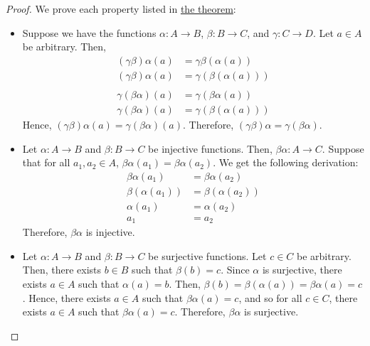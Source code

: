     \begin{proof} We prove each property listed in \hyperref[thm:fcprop]{the theorem}:
        \begin{itemize}
            \item Suppose we have the functions \(\alpha : A \to B\), \(\beta : B \to C\), and \(\gamma : C \to D\). Let \(a\in A\) be arbitrary. Then,
            \begin{align*}
                (\gamma\beta)\alpha(a) &= \gamma\beta\left(\alpha(a)\right) \\
                (\gamma\beta)\alpha(a) &= \gamma\left(\beta\left(\alpha(a)\right)\right) \\\\
                \gamma(\beta\alpha)(a) &= \gamma\left(\beta\alpha(a)\right) \\
                \gamma(\beta\alpha)(a) &= \gamma\left(\beta\left(\alpha(a)\right)\right)
            \end{align*}
            Hence, \((\gamma\beta)\alpha(a) = \gamma(\beta\alpha)(a)\). Therefore, \((\gamma\beta)\alpha = \gamma(\beta\alpha)\).

            \item Let \(\alpha : A \to B\) and \(\beta : B \to C\) be injective functions. Then, \(\beta\alpha : A \to C\). Suppose that for all \(a_1, a_2 \in A\), \(\beta\alpha(a_1) = \beta\alpha(a_2)\). We get the following derivation:
            \begin{align*}
                \beta\alpha(a_1) &= \beta\alpha(a_2) \\
                \beta\left(\alpha(a_1)\right) &= \beta\left(\alpha(a_2)\right) \\
                \alpha(a_1) &= \alpha(a_2) \\
                a_1 &= a_2
            \end{align*}
            Therefore, \(\beta\alpha\) is injective.

            \item Let \(\alpha : A \to B\) and \(\beta : B \to C\) be surjective functions. Let \(c \in C\) be arbitrary. Then, there exists \(b \in B\) such that \(\beta(b) = c\). Since \(\alpha\) is surjective, there exists \(a\in A\) such that \(\alpha(a) = b\). Then, \(\beta(b) = \beta(\alpha(a)) = \beta\alpha(a) = c\). Hence, there exists \(a\in A\) such that \(\beta\alpha(a) = c\), and so for all \(c \in C\), there exists \(a\in A\) such that \(\beta\alpha(a) = c\). Therefore, \(\beta\alpha\) is surjective.
        \end{itemize}
    \end{proof}
